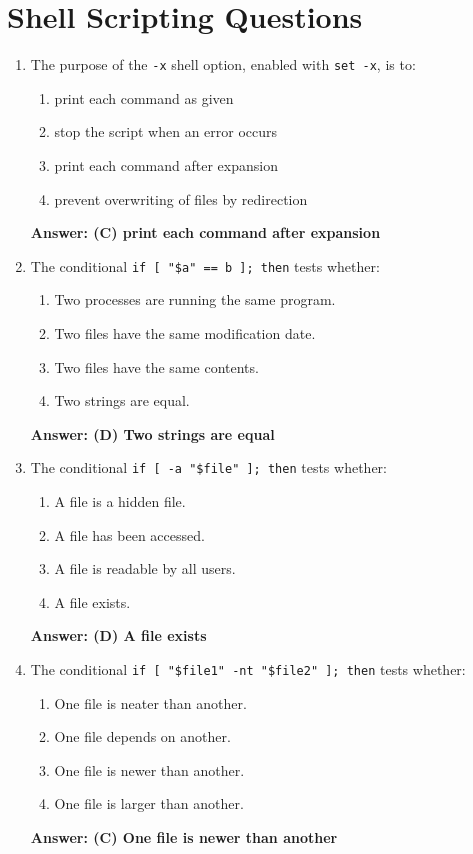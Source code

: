 \documentclass{article}
\begin{document}
\section*{Shell Scripting Questions}

\begin{enumerate}
  \item The purpose of the \texttt{-x} shell option, enabled with \texttt{set -x}, is to:
  \begin{enumerate}[label=(\Alph*)]
    \item print each command as given
    \item stop the script when an error occurs
    \item print each command after expansion
    \item prevent overwriting of files by redirection
  \end{enumerate}
  \textbf{Answer: (C) print each command after expansion}

  \item The conditional \texttt{if [ "\$a" == b ]; then} tests whether:
  \begin{enumerate}[label=(\Alph*)]
    \item Two processes are running the same program.
    \item Two files have the same modification date.
    \item Two files have the same contents.
    \item Two strings are equal.
  \end{enumerate}
  \textbf{Answer: (D) Two strings are equal}

  \item The conditional \texttt{if [ -a "\$file" ]; then} tests whether:
  \begin{enumerate}[label=(\Alph*)]
    \item A file is a hidden file.
    \item A file has been accessed.
    \item A file is readable by all users.
    \item A file exists.
  \end{enumerate}
  \textbf{Answer: (D) A file exists}

  \item The conditional \texttt{if [ "\$file1" -nt "\$file2" ]; then} tests whether:
  \begin{enumerate}[label=(\Alph*)]
    \item One file is neater than another.
    \item One file depends on another.
    \item One file is newer than another.
    \item One file is larger than another.
  \end{enumerate}
  \textbf{Answer: (C) One file is newer than another}


\end{enumerate}
\end{document}
